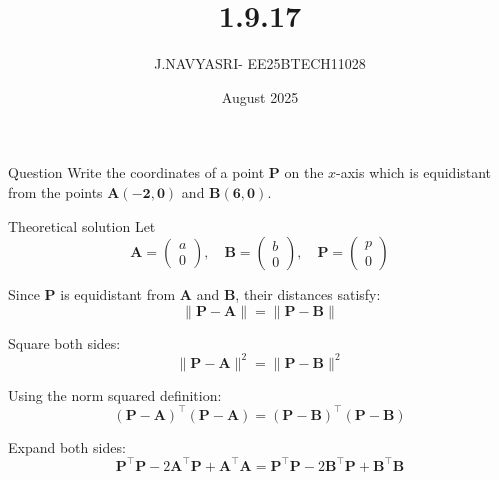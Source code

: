 \documentclass{beamer}
\title %
{1.9.17}
\date{August  2025}
\author %
{J.NAVYASRI- EE25BTECH11028}
\begin{document}
\frame{\titlepage}
\begin{frame}{Question}
Write the coordinates of a point \(\mathbf{P}\) on the \(x\)-axis which is equidistant from the points \(\mathbf{A(-2, 0)}\) and \(\mathbf{B(6, 0)}\).
\end{frame}

\begin{frame}{Theoretical solution}
Let
\begin{equation}
\mathbf{A} = \begin{pmatrix} a \\ 0 \end{pmatrix}, \quad
\mathbf{B} = \begin{pmatrix} b \\ 0 \end{pmatrix}, \quad
\mathbf{P} = \begin{pmatrix} p \\ 0 \end{pmatrix}
\end{equation}

Since \(\mathbf{P}\) is equidistant from \(\mathbf{A}\) and \(\mathbf{B}\), their distances satisfy:
\begin{equation}
\|\mathbf{P} - \mathbf{A}\| = \|\mathbf{P} - \mathbf{B}\|
\end{equation}

Square both sides:
\begin{equation}
\|\mathbf{P} - \mathbf{A}\|^2 = \|\mathbf{P} - \mathbf{B}\|^2
\end{equation}

Using the norm squared definition:
\begin{equation}
(\mathbf{P} - \mathbf{A})^\top (\mathbf{P} - \mathbf{A}) = (\mathbf{P} - \mathbf{B})^\top (\mathbf{P} - \mathbf{B})
\end{equation}

Expand both sides:
\begin{equation}
\mathbf{P}^\top \mathbf{P} - 2 \mathbf{A}^\top \mathbf{P} + \mathbf{A}^\top \mathbf{A} = \mathbf{P}^\top \mathbf{P} - 2 \mathbf{B}^\top \mathbf{P} + \mathbf{B}^\top \mathbf{B}
\end{equation}

\end{frame}
\end{document}
